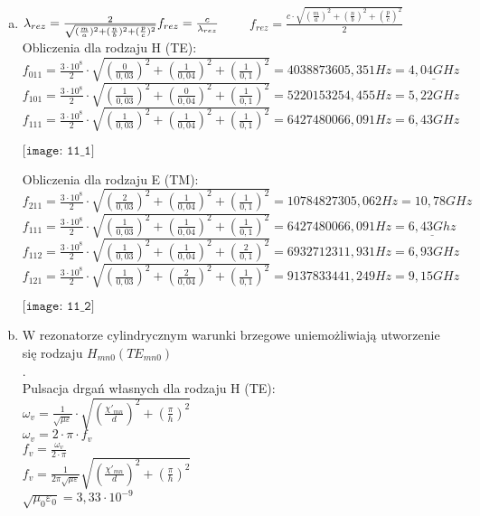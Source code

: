 \begin{solution}
\begin{enumerate}[a)]

\item $\lambda_{rez} = \frac{2}{\sqrt{(\frac{m}{a})^2+(\frac{n}{b})^2+(\frac{p}{c})^2}} \\
f_{rez} = \frac{c}{\lambda_{rez}} \qquad$
$f_{rez} = \frac {c \cdot \sqrt{(\frac{m}{a})^2+(\frac{n}{b})^2+(\frac{p}{c})^2}}{2}$\\

Obliczenia dla rodzaju H (TE): \\
$f_{011} = \frac{3 \cdot 10^8}{2} \cdot \sqrt{(\frac{0}{0,03})^2+(\frac{1}{0,04})^2+(\frac{1}{0,1})^2} = 4038873605,351 Hz = \underline{4,04 GHz} $\\
$f_{101} = \frac{3 \cdot 10^8}{2} \cdot \sqrt{(\frac{1}{0,03})^2+(\frac{0}{0,04})^2+(\frac{1}{0,1})^2} = 5220153254,455 Hz = 5,22 GHz $\\
$f_{111} = \frac{3 \cdot 10^8}{2} \cdot \sqrt{(\frac{1}{0,03})^2+(\frac{1}{0,04})^2+(\frac{1}{0,1})^2} = 6427480066,091 Hz = 6,43 GHz$\\
\begin{center}
    $\texttt{[image: 11\_1]}$\\
\end{center}

Obliczenia dla rodzaju E (TM): \\

$f_{211} = \frac{3 \cdot 10^8}{2} \cdot \sqrt{(\frac{2}{0,03})^2+(\frac{1}{0,04})^2+(\frac{1}{0,1})^2} = 10784827305,062 Hz = 10,78 GHz $\\
$f_{111} = \frac{3 \cdot 10^8}{2} \cdot \sqrt{(\frac{1}{0,03})^2+(\frac{1}{0,04})^2+(\frac{1}{0,1})^2} = 6427480066,091 Hz =  \underline{6,43 Ghz}$\\
$f_{112} = \frac{3 \cdot 10^8}{2} \cdot \sqrt{(\frac{1}{0,03})^2+(\frac{1}{0,04})^2+(\frac{2}{0,1})^2} = 6932712311,931 Hz = 6,93 GHz $\\
$f_{121} = \frac{3 \cdot 10^8}{2} \cdot \sqrt{(\frac{1}{0,03})^2+(\frac{2}{0,04})^2+(\frac{1}{0,1})^2} = 9137833441,249 Hz = 9,15 GHz$\\
\begin{center}
    $\texttt{[image: 11\_2]}$\\
\end{center}

\item W rezonatorze cylindrycznym warunki brzegowe uniemożliwiają utworzenie się rodzaju $H_{mn0} (TE_{mn0})$\\. \\
Pulsacja drgań własnych dla rodzaju H (TE): \\
 $\omega_v = \frac{1}{\sqrt{\mu \varepsilon}} \cdot \sqrt{(\frac{ \chi'_{mn} }{d})^2+(\frac{ \pi }{h})^2} $\\
$\omega_v = 2 \cdot \pi \cdot f_v$\\
$f_v = \frac{\omega_v}{2\cdot \pi} $\\
$f_v = \frac{1}{2\pi\sqrt{\mu \varepsilon}}\sqrt{(\frac{ \chi'_{mn} }{d})^2+(\frac{ \pi }{h})^2} $\\
$\sqrt{\mu_0 \varepsilon_0}=3,33 \cdot 10^{-9}$ \\


\end{enumerate}
\end{solution}
